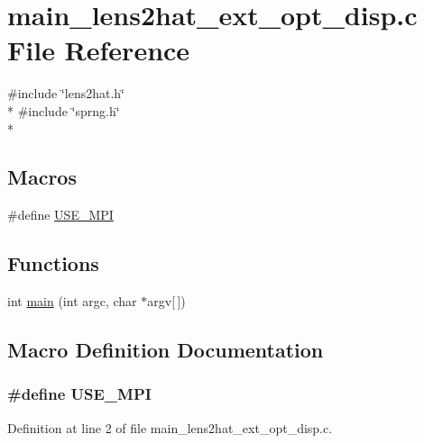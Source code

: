 \section{main\-\_\-lens2hat\-\_\-ext\-\_\-opt\-\_\-disp.\-c File Reference}
\label{main__lens2hat__ext__opt__disp_8c}
{\ttfamily \#include \char`\"{}lens2hat.\-h\char`\"{}}\\*
{\ttfamily \#include \char`\"{}sprng.\-h\char`\"{}}\\*
\subsection*{Macros}
\begin{DoxyCompactItemize}
\item 
\#define \hyperlink{main__lens2hat__ext__opt__disp_8c_a3869d282031f6ea6b50fdb980b758420}{U\-S\-E\-\_\-\-M\-P\-I}
\end{DoxyCompactItemize}
\subsection*{Functions}
\begin{DoxyCompactItemize}
\item 
int \hyperlink{main__lens2hat__ext__opt__disp_8c_a0ddf1224851353fc92bfbff6f499fa97}{main} (int argc, char $\ast$argv\mbox{[}$\,$\mbox{]})
\end{DoxyCompactItemize}


\subsection{Macro Definition Documentation}
\subsubsection[{U\-S\-E\-\_\-\-M\-P\-I}]{\setlength{\rightskip}{0pt plus 5cm}\#define U\-S\-E\-\_\-\-M\-P\-I}\label{main__lens2hat__ext__opt__disp_8c_a3869d282031f6ea6b50fdb980b758420}


Definition at line 2 of file main\-\_\-lens2hat\-\_\-ext\-\_\-opt\-\_\-disp.\-c.



